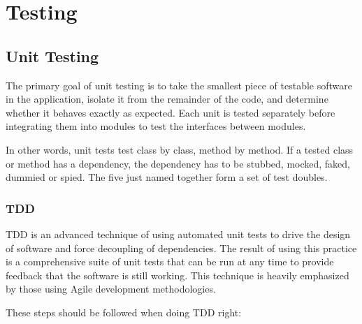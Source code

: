 \chapter{Testing}\label{cha:testing}

	\section{Unit Testing}
	
	\cite{msdnunit}
	The primary goal of unit testing is to take the smallest piece of testable software in the application, isolate it from
	the remainder of the code, and determine whether it behaves exactly as expected. Each unit is tested separately
	before integrating them into modules to test the interfaces between modules.
	
	In other words, unit tests test class by class, method by method. If a tested class or method has a dependency, the
	dependency has to be stubbed, mocked, faked, dummied or spied. The five just named together form a set of test doubles.

	\subsection{\gls{TDD}}
	
	\cite{msdntdd}
	TDD is an advanced technique of using automated unit tests to drive the design of software
	and force decoupling of dependencies. The result of using this practice is a comprehensive suite of unit tests that can
	be run at any time to provide feedback that the software is still working. This technique is heavily emphasized by
	those using Agile development methodologies.
	
	These steps should be followed when doing TDD right:
	
